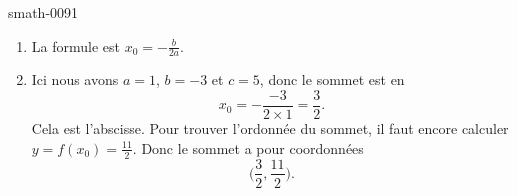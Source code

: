 
\begin{corrige}{smath-0091}

    \begin{enumerate}
        \item
            La formule est \( x_0=-\frac{ b }{ 2a }\).
        \item
            Ici nous avons \( a=1\), \( b=-3\) et \( c=5\), donc le sommet est en
            \begin{equation}
                x_0=-\frac{ -3 }{ 2\times 1 }=\frac{ 3 }{ 2 }.
            \end{equation}
            Cela est l'abscisse. Pour trouver l'ordonnée du sommet, il faut encore calculer \( y=f(x_0)=\frac{ 11 }{ 2 }\). Donc le sommet a pour coordonnées
            \begin{equation}
                \big( \frac{ 3 }{ 2 },\frac{ 11 }{2} \big).
            \end{equation}
    \end{enumerate}

\end{corrige}
